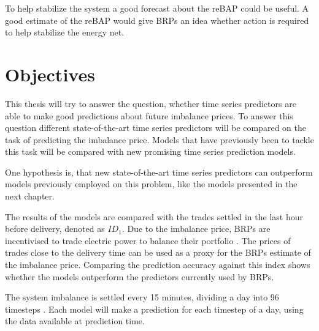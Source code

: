 \documentclass[class=scrbook, crop=false]{standalone}
\begin{document}
To help stabilize the system a good forecast about the reBAP could be useful. A good estimate of the reBAP would give BRPs an idea whether action is required to help stabilize the energy net.

\section{Objectives}
\label{Section::Objectives}
This thesis will try to answer the question, whether time series predictors are able to make good predictions about future imbalance prices. To answer this question different state-of-the-art time series predictors will be compared on the task of predicting the imbalance price. 
Models that have previously been to tackle this task will be compared with new promising time series prediction models.

One hypothesis is, that new state-of-the-art time series predictors can outperform models previously employed on this problem, like the models presented in the next chapter. 

The results of the models are compared with the trades settled in the last hour before delivery, denoted as $ID_1$. Due to the imbalance price, BRPs are incentivised to trade electric power to balance their portfolio \cite{kochPASSIVEBALANCINGINTRADAY2020a}. 
The prices of trades close to the delivery time can be used as a proxy for the BRPs estimate of the imbalance price. Comparing the prediction accuracy against this index shows whether the models outperform the predictors currently used by BRPs.


 The system imbalance is settled every 15 minutes, dividing a day into 96 timesteps \cite{NetztransparenzReBAP}.
 Each model will make a prediction for each timestep of a day, using the data available at prediction time.

\end{document}
